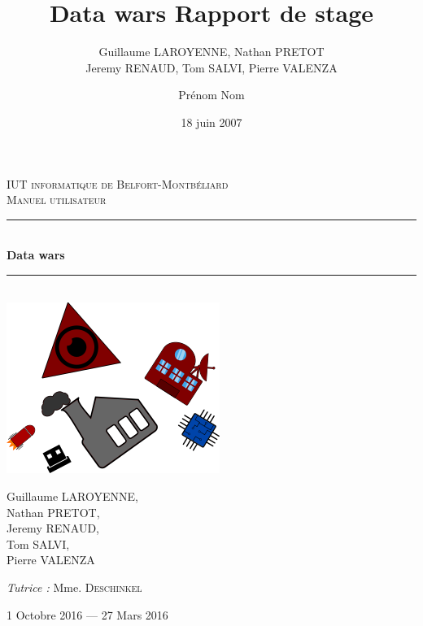 \documentclass[a4paper, titlepage]{livret}
\title{Data wars }
\author{Guillaume LAROYENNE, Nathan PRETOT \\ Jeremy RENAUD, Tom SALVI, Pierre VALENZA}
\title{Rapport de stage}      %
\author{Prénom Nom}           %
\date{18 juin 2007}           %
\newcommand{\HRule}{\rule{\linewidth}{0.5mm}}
\begin{document}
\begin{titlepage}
  \begin{sffamily}
  \begin{center}


    \textsc{\LARGE IUT informatique de Belfort-Montbéliard}\\[2cm]

    \textsc{\Large Manuel utilisateur}\\[1.5cm]

    \HRule \\[0.4cm]
    { \huge \bfseries Data wars\\[0.4cm] }

    \HRule \\[2cm]
    \includegraphics[scale=0.4]{../mainPageimg.png}
    \\[2cm]

    \begin{minipage}{0.4\textwidth}
      \begin{flushleft} \large
        Guillaume \textsc{LAROYENNE}, \\ Nathan \textsc{PRETOT}, \\ Jeremy \textsc{RENAUD}, \\ Tom \textsc{SALVI}, \\ Pierre \textsc{VALENZA}
      \end{flushleft}
    \end{minipage}
    \begin{minipage}{0.4\textwidth}
      \begin{flushright} \large
        \emph{Tutrice :} Mme. \textsc{Deschinkel} \\
      \end{flushright}
    \end{minipage}

    \vfill

    {\large 1\ier{} Octobre 2016 — 27 Mars 2016}

  \end{center}
  \end{sffamily}
\end{titlepage}
\end{document}
